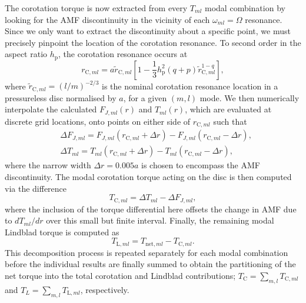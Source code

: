The corotation torque is now extracted from every $T_{ml}$ modal combination by looking for the AMF discontinuity in the vicinity of each $\omega_{ml} = \Omega$ resonance. Since we only want to extract the discontinuity about a specific point, we must precisely pinpoint the location of the corotation resonance. To second order in the aspect ratio $h_\mathrm{p}$, the corotation resonance occurs at
%
\begin{equation}
    r_{\textrm{C},ml} = a \tilde{r}_{\textrm{C},ml}\left[1-\frac{1}{3} h_\textrm{p}^2 (q+p) \tilde{r}_{\textrm{C},ml}^{1-q}\right],
\end{equation}
%
where $\tilde{r}_{\textrm{C},ml} = (l/m)^{-2/3}$ is the nominal corotation resonance location in a pressureless disc normalised by $a$, for a given $(m,l)$ mode. We then numerically interpolate the calculated $F_{J,ml}(r)$ and $T_{ml}(r)$, which are evaluated at discrete grid locations, onto points on either side of $r_{\textrm{C},ml}$ such that 
%
\begin{align}
    &\Delta F_{J,ml} = F_{J,ml}(r_{\textrm{C},ml}+\Delta r) - F_{J,ml}(r_{\textrm{C},ml}-\Delta r),\\
    &\Delta T_{ml} = T_{ml}(r_{\textrm{C},ml}+\Delta r) - T_{ml}(r_{\textrm{C},ml}-\Delta r),
\end{align}
%
where the narrow width $\Delta r = 0.005a$ is chosen to encompass the AMF discontinuity. The modal corotation torque acting on the disc is then computed via the difference
%
\begin{equation}
    T_{\textrm{C},ml} = \Delta T_{ml}-\Delta F_{J,ml},
\end{equation}
%
where the inclusion of the torque differential here offsets the change in AMF due to $dT_{ml}/dr$ over this small but finite interval. Finally, the remaining modal Lindblad torque is computed as
%
\begin{equation}
    T_{\textrm{L},ml} = T_{\textrm{net},ml}-T_{\textrm{C},ml}.
\end{equation}
%
This decomposition process is repeated separately for each modal combination before the individual results are finally summed to obtain the partitioning of the net torque into the total corotation and Lindblad contributions; $T_\textrm{C} = \sum_{m,l} T_{\textrm{C},ml}$ and $T_{L} = \sum_{m,l} T_{\textrm{L},ml}$, respectively.




